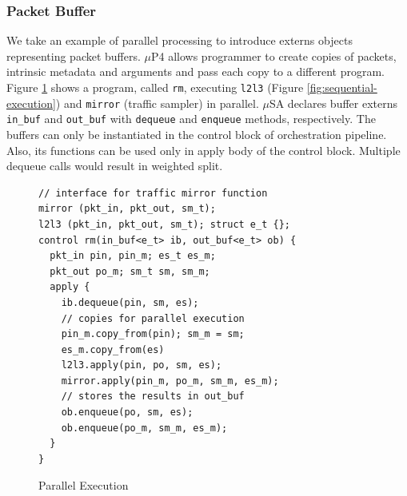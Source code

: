 \documentclass{hotnets19}
\begin{document}
\subsubsection{Packet Buffer}
We take an example of parallel processing to introduce externs objects representing packet buffers.
$\mu$P4 allows programmer to create copies of packets, intrinsic metadata and arguments and pass each copy to a different program.
Figure \ref{fig:parallel-execution} shows a program, called \texttt{rm}, executing \texttt{l2l3} (Figure \ref{fig:sequential-execution}) and \texttt{mirror} (traffic sampler) in parallel.
$\mu$SA declares buffer externs \texttt{in\_buf} and \texttt{out\_buf} with \texttt{dequeue} and \texttt{enqueue} methods, respectively.
The buffers can only be instantiated in the control block of orchestration pipeline.
Also, its functions can be used only in apply body of the control block.
Multiple dequeue calls would result in weighted split.

\begin{figure}
\begin{lstlisting}[frame=none]
// interface for traffic mirror function
mirror (pkt_in, pkt_out, sm_t);
l2l3 (pkt_in, pkt_out, sm_t); struct e_t {};
control rm(in_buf<e_t> ib, out_buf<e_t> ob) {
  pkt_in pin, pin_m; es_t es_m;
  pkt_out po_m; sm_t sm, sm_m;
  apply {
    ib.dequeue(pin, sm, es);
    // copies for parallel execution
    pin_m.copy_from(pin); sm_m = sm; 
    es_m.copy_from(es)
    l2l3.apply(pin, po, sm, es);
    mirror.apply(pin_m, po_m, sm_m, es_m);
    // stores the results in out_buf
    ob.enqueue(po, sm, es);
    ob.enqueue(po_m, sm_m, es_m);
  }
}
\end{lstlisting}
\caption{Parallel Execution}
\label{fig:parallel-execution}
\end{figure}
\end{document}
